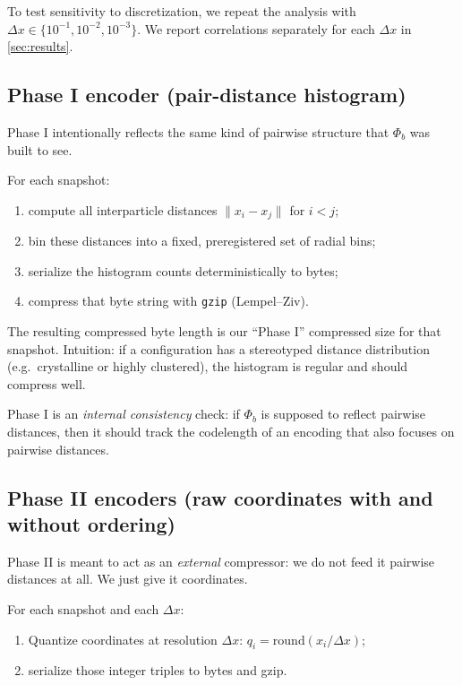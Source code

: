 \documentclass[11pt,a4paper]{article}
\numberwithin{equation}{section}
\newcommand{\norm}[1]{\lVert #1\rVert}
\newcommand{\phib}{\Phi_b}
\begin{document}
To test sensitivity to discretization, we repeat the analysis with $\Delta x \in \{10^{-1},10^{-2},10^{-3}\}$. We report correlations separately for each $\Delta x$ in \cref{sec:results}.

\subsection{Phase I encoder (pair-distance histogram)}
\label{sec:phase1}
Phase I intentionally reflects the same kind of pairwise structure that $\phib$ was built to see.

For each snapshot:
\begin{enumerate}[label=(\alph*)]
\item compute all interparticle distances $\norm{x_i - x_j}$ for $i<j$;
\item bin these distances into a fixed, preregistered set of radial bins;
\item serialize the histogram counts deterministically to bytes;
\item compress that byte string with \texttt{gzip} (Lempel--Ziv).
\end{enumerate}

The resulting compressed byte length is our ``Phase I'' compressed size for that snapshot. Intuition: if a configuration has a stereotyped distance distribution (e.g.\ crystalline or highly clustered), the histogram is regular and should compress well.

Phase I is an \emph{internal consistency} check: if $\phib$ is supposed to reflect pairwise distances, then it should track the codelength of an encoding that also focuses on pairwise distances.

\subsection{Phase II encoders (raw coordinates with and without ordering)}
\label{sec:phase2}
Phase II is meant to act as an \emph{external} compressor: we do not feed it pairwise distances at all. We just give it coordinates.

For each snapshot and each $\Delta x$:
\begin{enumerate}[label=(\alph*)]
\item Quantize coordinates at resolution $\Delta x$: $q_i = \mathrm{round}(x_i / \Delta x)$;
\item serialize those integer triples to bytes and gzip.
\end{enumerate}
\end{document}
